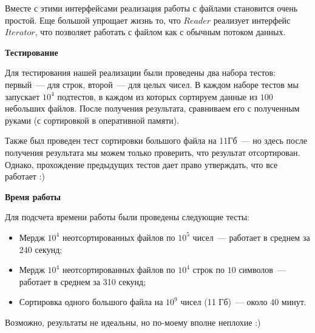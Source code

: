 \documentclass[11pt,a4paper,oneside]{article}
\begin{document}
Вместе с этими интерфейсами реализация работы с файлами становится очень простой. Еще большой упрощает жизнь то, что $Reader$ реализует интерфейс $Iterator$, что позволяет работать с файлом как с обычным потоком данных.

\textbf{Тестирование}

Для тестирования нашей реализации были проведены два набора тестов: первый~--- для строк, второй~--- для целых чисел. В каждом наборе тестов мы запускает $10^4$ подтестов, в каждом из которых сортируем данные из $100$ небольших файлов. После получения результата, сравниваем его с полученным руками (с сортировкой в оперативной памяти).

Также был проведен тест сортировки большого файла на 11Гб~--- но здесь после получения результата мы можем только проверить, что результат отсортирован. Однако, прохождение предыдущих тестов дает право утверждать, что все работает :)

\textbf{Время работы}

Для подсчета времени работы были проведены следующие тесты: 

\begin{itemize}
\item Мердж $10^4$ неотсортированных файлов по $10^5$ чисел~--- работает в среднем за 240 секунд;
\item Мердж $10^4$ неотсортированных файлов по $10^4$ строк по $10$ символов~--- работает в среднем за 310 секунд;
\item Сортировка одного большого файла на $10^9$ чисел (11 Гб)~--- около $40$ минут.
\end{itemize}

Возможно, результаты не идеальны, но по-моему вполне неплохие :)
\end{document}
